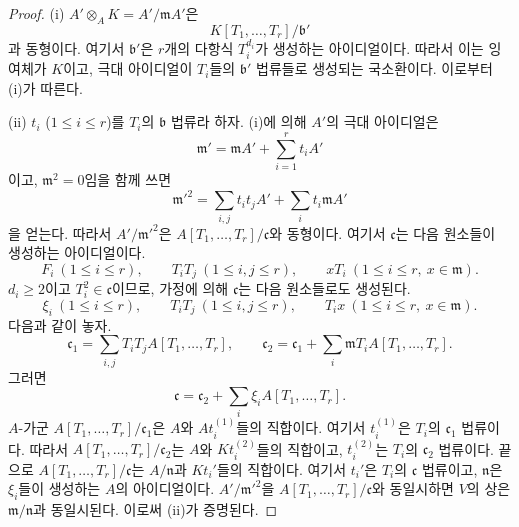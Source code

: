 \begin{proof}
(i) $A'\otimes_AK=A'/\mathfrak mA'$은
\[
  K[T_1,\ldots,T_r]/\mathfrak b'
\]
과 동형이다. 여기서 $\mathfrak b'$은 $r$개의 다항식
$T_i^{d_i}$가 생성하는 아이디얼이다. 따라서 이는 잉여체가 $K$이고,
극대 아이디얼이 $T_i$들의 $\mathfrak b'$ 법류들로 생성되는 국소환이다.
이로부터 (i)가 따른다.

(ii) $t_i$ ($1\leqslant i\leqslant r$)를 $T_i$의 $\mathfrak b$ 법류라
하자. (i)에 의해 $A'$의 극대 아이디얼은
\[
  \mathfrak m'=\mathfrak mA'+\sum_{i=1}^r t_iA'
\]
이고, $\mathfrak m^2=0$임을 함께 쓰면
\[
  \mathfrak m'^2=\sum_{i,j}t_it_jA'+\sum_i t_i\mathfrak mA'
\]
을 얻는다. 따라서 $A'/\mathfrak m'^2$은
$A[T_1,\ldots,T_r]/\mathfrak c$와 동형이다. 여기서
$\mathfrak c$는 다음 원소들이 생성하는 아이디얼이다.
\[
  F_i\ (1\leqslant i\leqslant r),\qquad
  T_iT_j\ (1\leqslant i,j\leqslant r),\qquad
  xT_i\ (1\leqslant i\leqslant r,\ x\in\mathfrak m).
\]
$d_i\geqslant2$이고 $T_i^2\in\mathfrak c$이므로, 가정에 의해
$\mathfrak c$는 다음 원소들로도 생성된다.
\[
  \xi_i\ (1\leqslant i\leqslant r),\qquad
  T_iT_j\ (1\leqslant i,j\leqslant r),\qquad
  T_ix\ (1\leqslant i\leqslant r,\ x\in\mathfrak m).
\]
다음과 같이 놓자.
\[
  \mathfrak c_1=\sum_{i,j}T_iT_jA[T_1,\ldots,T_r],\qquad
  \mathfrak c_2=\mathfrak c_1+
  \sum_i\mathfrak mT_iA[T_1,\ldots,T_r].
\]
그러면
\[
  \mathfrak c=\mathfrak c_2+
  \sum_i\xi_iA[T_1,\ldots,T_r].
\]
$A$-가군 $A[T_1,\ldots,T_r]/\mathfrak c_1$은 $A$와
$At_i^{(1)}$들의 직합이다. 여기서 $t_i^{(1)}$은 $T_i$의
$\mathfrak c_1$ 법류이다. 따라서
$A[T_1,\ldots,T_r]/\mathfrak c_2$는 $A$와
$Kt_i^{(2)}$들의 직합이고, $t_i^{(2)}$는 $T_i$의
$\mathfrak c_2$ 법류이다. 끝으로
$A[T_1,\ldots,T_r]/\mathfrak c$는 $A/\mathfrak n$과
$Kt_i'$들의 직합이다. 여기서 $t_i'$은 $T_i$의 $\mathfrak c$ 법류이고,
$\mathfrak n$은 $\xi_i$들이 생성하는 $A$의 아이디얼이다.
$A'/\mathfrak m'^2$을 $A[T_1,\ldots,T_r]/\mathfrak c$와 동일시하면
$V$의 상은 $\mathfrak m/\mathfrak n$과 동일시된다. 이로써 (ii)가
증명된다.
\end{proof}

